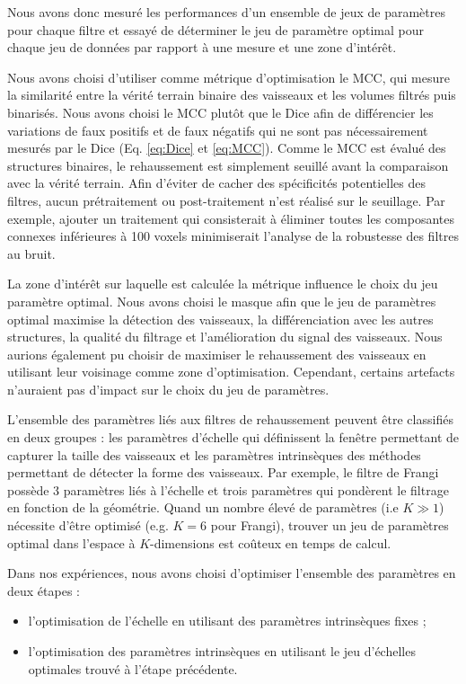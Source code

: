 Nous avons donc mesuré les performances d'un ensemble de jeux de paramètres pour chaque filtre et essayé de déterminer le jeu de paramètre optimal pour chaque jeu de données par rapport à une mesure et une zone d'intérêt.

Nous avons choisi d'utiliser comme métrique d'optimisation le MCC, qui mesure la similarité entre la vérité terrain binaire des vaisseaux et les volumes filtrés puis binarisés. Nous avons choisi le MCC plutôt que le Dice afin de différencier les variations de faux positifs et de faux négatifs qui ne sont pas nécessairement mesurés par le Dice (Eq. \ref{eq:Dice} et \ref{eq:MCC}). Comme le MCC est évalué des structures binaires, le rehaussement est simplement seuillé avant la comparaison avec la vérité terrain. Afin d'éviter de cacher des spécificités potentielles des filtres, aucun prétraitement ou post-traitement n'est réalisé sur le seuillage. Par exemple, ajouter un traitement qui consisterait à éliminer toutes les composantes connexes inférieures à 100 voxels minimiserait l'analyse de la robustesse des filtres au bruit.

La zone d'intérêt sur laquelle est calculée la métrique influence le choix du jeu paramètre optimal. Nous avons choisi le masque \maskglobal afin que le jeu de paramètres optimal maximise la détection des vaisseaux, la  différenciation avec les autres structures, la qualité du filtrage et l'amélioration du signal des vaisseaux. Nous aurions également pu choisir de maximiser le rehaussement des vaisseaux en utilisant leur voisinage comme zone d'optimisation. Cependant, certains artefacts n'auraient pas d'impact sur le choix du jeu de paramètres. 

L'ensemble des paramètres liés aux filtres de rehaussement peuvent être classifiés en deux groupes : les paramètres d'échelle qui définissent la fenêtre permettant de capturer la taille des vaisseaux et les paramètres intrinsèques des méthodes permettant de détecter la forme des vaisseaux. Par exemple, le filtre de Frangi possède 3 paramètres liés à l'échelle et trois paramètres qui pondèrent le filtrage en fonction de la géométrie. Quand un nombre élevé de paramètres (i.e $K \gg 1$) nécessite d'être optimisé (e.g. $K=6$ pour Frangi), trouver un jeu de paramètres optimal dans l'espace à $K$-dimensions est coûteux en temps de calcul.

Dans nos expériences, nous avons choisi d'optimiser l'ensemble des paramètres en deux étapes :

\begin{itemize}
\item l'optimisation de l'échelle en utilisant des paramètres intrinsèques fixes ;
\item l'optimisation des paramètres intrinsèques en utilisant le jeu d'échelles optimales trouvé à l'étape précédente.
\end{itemize}


